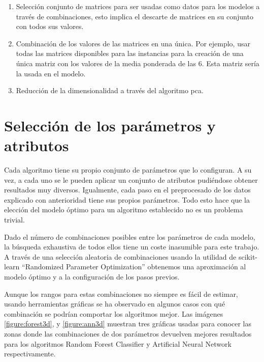 \begin{enumerate}
    \item Selección conjunto de matrices para ser usadas como datos para los modelos a través de combinaciones, esto implica el descarte de matrices en su conjunto con todos sus valores.
    
    \item Combinación de los valores de las matrices en una única. Por ejemplo, usar todas las matrices disponibles para las instancias para la creación de una única matriz con los valores de la media ponderada de las 6. Esta matriz sería la usada en el modelo.
    
    \item Reducción de la dimensionalidad a través del algoritmo \gls{pca}.
    
\end{enumerate}

\section{Selección de los parámetros y atributos}

Cada algoritmo tiene su propio conjunto de parámetros que lo configuran. A su vez, a cada uno se le pueden aplicar un conjunto de atributos pudiéndose obtener resultados muy diversos. Igualmente, cada paso en el preprocesado de los datos explicado con anterioridad tiene sus propios parámetros. Todo esto hace que la elección del modelo óptimo para un algoritmo establecido no es un problema trivial.

Dado el número de combinaciones posibles entre los parámetros de cada modelo, la búsqueda exhaustiva de todos ellos tiene un coste inasumible para este trabajo. A través de una selección aleatoria de combinaciones usando la utilidad de scikit-learn ``Randomized Parameter Optimization'' obtenemos una aproximación al modelo óptimo y a la configuración de los pasos previos.

Aunque los rangos para estas combinaciones no siempre es fácil de estimar, usando herramientas gráficas se ha observado en algunos casos con qué combinación se podrían comportar los algoritmos mejor. Las imágenes \ref{figure:forest3d}, y \ref{figure:ann3d} muestran tres gráficas usadas para conocer las zonas donde las combinaciones de dos parámetros devuelven mejores resultados para los algoritmos  Random Forest Classifier y Artificial Neural Network respectivamente.


